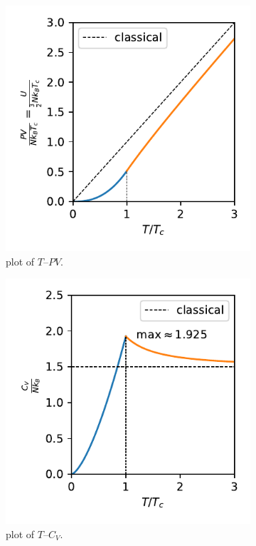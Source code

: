 \begin{itemize}
	\begin{figure}[H]
		\centering
		\begin{subfigure}{0.4\linewidth}
			\centering
			\includegraphics[scale=0.8]{figures/plot of T--PV.pdf}
			\caption{plot of $T$--$P V$.}
		\end{subfigure}
		\begin{subfigure}{0.4\linewidth}
			\centering
			\includegraphics[scale=0.8]{figures/plot of T--C_V.pdf}
			\caption{plot of $T$--$C_V$.}
		\end{subfigure}
		\caption{}
	\end{figure}
	

\end{itemize}
